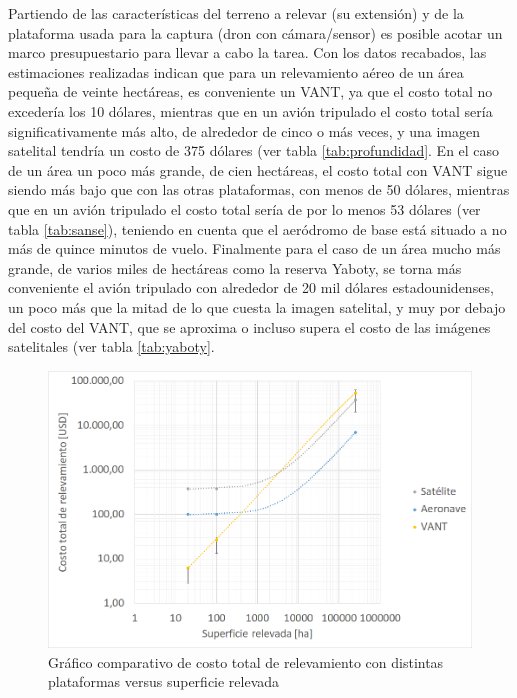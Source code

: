 Partiendo de las características del terreno a relevar (su extensión) y de la plataforma usada para la captura (dron con cámara/sensor) es posible acotar un marco presupuestario para llevar a cabo la tarea. Con los datos recabados, las estimaciones realizadas indican que para un relevamiento aéreo de un área pequeña de veinte hectáreas, es conveniente un VANT, ya que el costo total no excedería los 10 dólares, mientras que en un avión tripulado el costo total sería significativamente más alto, de alrededor de cinco o más veces, y una imagen satelital tendría un costo de 375 dólares (ver tabla \ref{tab:profundidad}. En el caso de un área un poco más grande, de cien hectáreas, el costo total con VANT sigue siendo más bajo que con las otras plataformas, con menos de 50 dólares, mientras que en un avión tripulado el costo total sería de por lo menos 53 dólares (ver tabla \ref{tab:sanse}), teniendo en cuenta que el aeródromo de base está situado a no más de quince minutos de vuelo. Finalmente para el caso de un área mucho más grande, de varios miles de hectáreas como la reserva Yaboty, se torna más conveniente el avión tripulado con alrededor de 20 mil dólares estadounidenses, un poco más que la mitad de lo que cuesta la imagen satelital, y muy por debajo del costo del VANT, que se aproxima o incluso supera el costo de las imágenes satelitales (ver tabla \ref{tab:yaboty}.


\begin{figure}[h!]
    \includegraphics[width=\textwidth]{Imagenes/grafico bloque 1.png}
     \hfill
     \caption{Gráfico comparativo de costo total de relevamiento con distintas plataformas versus superficie relevada}
    \label{grafico_comparativo}
\end{figure}

